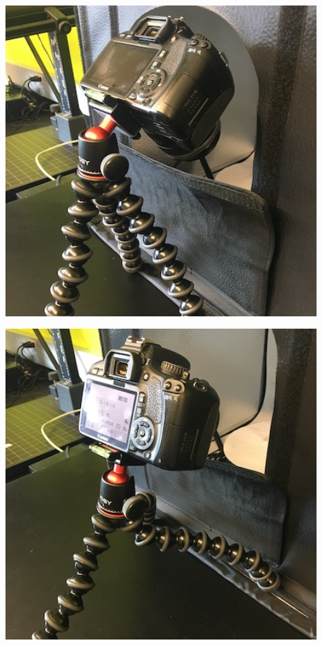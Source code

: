 \documentclass[
]{book}
\theoremstyle{definition}
\theoremstyle{definition}
\theoremstyle{definition}
\theoremstyle{definition}
\theoremstyle{remark}
\begin{document}
\includegraphics[width=0.9\textwidth,height=\textheight]{Figures/camera_position_1.JPG}

\includegraphics[width=0.9\textwidth,height=\textheight]{Figures/camera_position_2.JPG}
\end{document}
